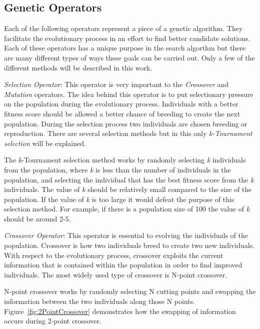 \subsection{Genetic Operators}

Each of the following operators represent a piece of a genetic algorithm. They facilitate the evolutionary process in an effort to find better candidate solutions. Each of these operators has a unique purpose in the search algorthm but there are many different types of ways these goals can be carried out. Only a few of the different methods will be described in this work.

\textit{Selection Operator}: This operator is very important to the \textit{Crossover} and \textit{Mutation} operators. The idea behind this operator is to put selectionary pressure on the population during the evolutionary process. Individuals with a better fitness score should be allowed a better chance of breeding to create the next population. During the selection process two individuals are chosen breeding or reproduction. There are several selection methods but in this only \textit{k-Tournament selection} will be explained.

The \textit{k}-Tournament selection method works by randomly selecting \textit{k} individuals from the population, where \textit{k} is less than the number of individuals in the population, and selecting the individual that has the best fitness score from the \textit{k} individuals. The value of \textit{k} should be relatively small compared to the size of the population. If the value of \textit{k} is too large it would defeat the purpose of this selection method. For example, if there is a population size of 100 the value of \textit{k} should be around 2-5.

\textit{Crossover Operator}: This operator is essential to evolving the individuals of the population. Crossover is how two individuals breed to create two new individuals. With respect to the evolutionary process, crossover exploits the current information that is contained within the population in order to find improved individuals. The most widely used type of crossover is N-point crossover.

N-point crossover works by randomly selecting N cutting points and swapping the information between the two individuals along those N points. Figure~\ref{fig:2PointCrossover} demonstrates how the swapping of information occurs during 2-point crossover.

